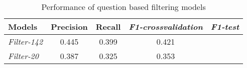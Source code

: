 \begin{table} [ht]
\begin{tabular}{lcccc}
\toprule
Models & Precision & Recall & \textit{F1-crossvalidation} & \textit{F1-test}  \\
\midrule
\textit{Filter-142} & 0.445 & 0.399 & 0.421 &  \\
\textit{Filter-20} & 0.387 & 0.325 & 0.353 &  \\
\bottomrule
\end{tabular}
\caption{Performance of question based filtering models}
\label{table:results_2}
\end{table}








